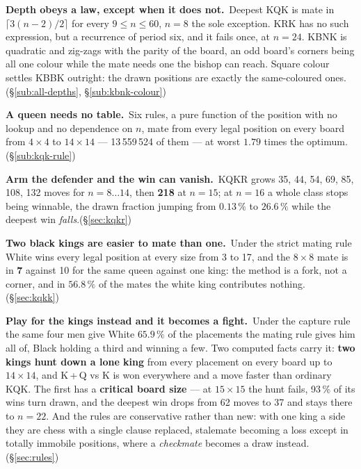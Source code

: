 \documentclass[10pt]{article}
\begin{document}
\smallskip
\noindent\textbf{Depth obeys a law, except when it does not.}\ Deepest KQK is
mate in $\lceil 3(n-2)/2\rceil$ for every $9\le n\le 60$, $n=8$ the sole
exception. KRK has no such expression, but a recurrence of period six, and it
fails once, at $n=24$. KBNK is quadratic and zig-zags with the parity of the
board, an odd board's corners being all one colour while the mate needs one the
bishop can reach. Square colour settles KBBK outright: the drawn positions are
exactly the same-coloured ones.\hfill(\S\ref{sub:all-depths},
\S\ref{sub:kbnk-colour})

\smallskip
\noindent\textbf{A queen needs no table.}\ Six rules, a pure function of the
position with no lookup and no dependence on $n$, mate from every legal
position on every board from $4\times4$ to $14\times14$ --- 13\,559\,524 of
them --- at worst $1.79$ times the optimum.\hfill(\S\ref{sub:kqk-rule})

\smallskip
\noindent\textbf{Arm the defender and the win can vanish.}\ KQKR grows 35, 44,
54, 69, 85, 108, 132 moves for $n=8\ldots14$, then \textbf{218} at $n=15$; at
$n=16$ a whole class stops being winnable, the drawn fraction jumping from
$0.13\,\%$ to $26.6\,\%$ while the deepest win \emph{falls}.\hfill(\S\ref{sec:kqkr})

\smallskip
\noindent\textbf{Two black kings are easier to mate than one.}\ Under the
strict mating rule White wins every legal position at every size from 3 to 17,
and the $8\times8$ mate is in \textbf{7} against 10 for the same queen against
one king: the method is a fork, not a corner, and in $56.8\,\%$ of the mates
the white king contributes nothing.\hfill(\S\ref{sec:kqkk})

\smallskip
\noindent\textbf{Play for the kings instead and it becomes a fight.}\ Under the
capture rule the same four men give White $65.9\,\%$ of the placements the
mating rule gives him all of, Black holding a third and winning a few. Two
computed facts carry it: \textbf{two kings hunt down a lone king} from every
placement on every board up to $14\times14$, and K\,+\,Q vs K is won everywhere
and a move faster than ordinary KQK. The first has a \textbf{critical board
size} --- at $15\times15$ the hunt fails, 93\,\% of its wins turn drawn, and
the deepest win drops from 62 moves to 37 and stays there to $n=22$. And the
rules are conservative rather than new: with one king a side they are chess
with a single clause replaced, stalemate becoming a loss except in totally
immobile positions, where a \emph{checkmate} becomes a draw
instead.\hfill(\S\ref{sec:rules})
\end{document}
